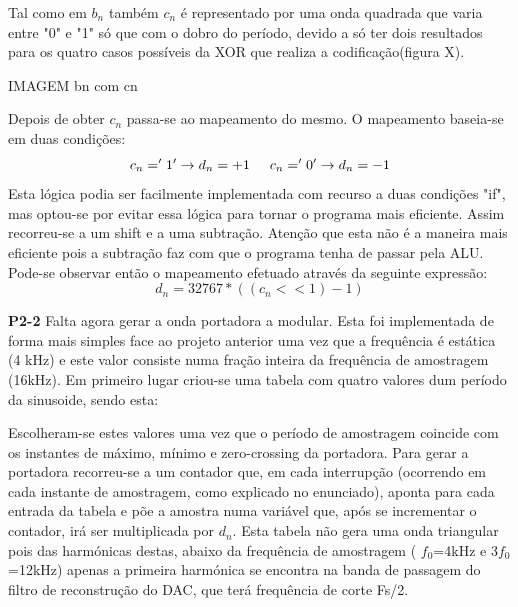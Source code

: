 \documentclass[11pt]{article}
\begin{document}
Tal como em $ b_n $ também $ c_n $ é representado por uma onda quadrada que varia entre "0" e "1" só que com o dobro do período, devido a só ter dois resultados para os quatro casos possíveis da XOR que realiza a codificação(figura X).

IMAGEM bn com cn
\vfill

Depois de obter $ c_n $ passa-se ao mapeamento do mesmo. O mapeamento baseia-se em duas condições:
\begin{equation}
	c_n= '1' \rightarrow d_n =+1 \hspace{5 mm} c_n='0' \rightarrow d_n=-1
\end{equation}
Esta lógica podia ser facilmente implementada com recurso a duas condições "if", mas optou-se por evitar essa lógica para tornar o programa mais eficiente.
Assim recorreu-se a um shift e a uma subtração. Atenção que esta não é a maneira mais eficiente pois a subtração faz com que o programa tenha de passar pela ALU.
Pode-se observar então o mapeamento efetuado através da seguinte expressão:
\begin{equation}
d_n=32767*((c_n << 1)-1)
\end{equation}


\textbf{P2-2}
Falta agora gerar a onda portadora a modular. Esta foi implementada de forma mais simples face ao projeto anterior uma vez que a frequência é estática (4 kHz) e este valor consiste numa fração inteira da frequência de amostragem (16kHz).
Em primeiro lugar criou-se uma tabela com quatro valores dum período da sinusoide, sendo esta: %

Escolheram-se estes valores uma vez que o período de amostragem coincide com os instantes de máximo, mínimo e zero-crossing da portadora. Para gerar a portadora recorreu-se a um contador que, em cada interrupção (ocorrendo em cada instante de amostragem, como explicado no enunciado), aponta para cada entrada da tabela e põe a amostra numa variável que, após se incrementar o contador, irá ser multiplicada por $d_n$. Esta tabela não gera uma onda triangular pois das harmónicas destas, abaixo da frequência de amostragem ( $f_0$=4kHz e 3$f_0$=12kHz) apenas a primeira harmónica se encontra na banda de passagem do filtro de reconstrução do DAC, que terá frequência de corte Fs/2.
\end{document}
